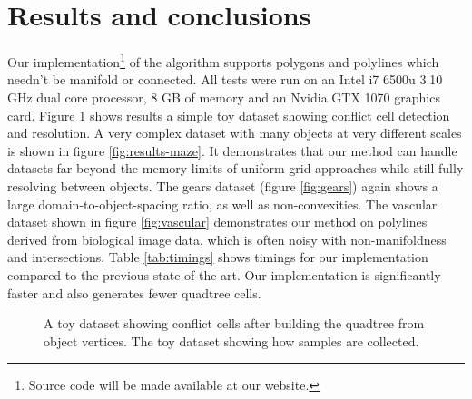 \documentclass[final,3p,times,twocolumn]{elsarticle}
\begin{document}
\section{Results and conclusions}
Our implementation\footnote{
Source code will be made available at our website. %
}
of the algorithm supports polygons and polylines which needn't be manifold or connected. All tests were run on
 an Intel i7 6500u 3.10 GHz dual core processor, 8 GB of memory and an Nvidia GTX 1070 graphics card. Figure \ref{fig:results-toy} shows results a simple toy dataset showing conflict cell detection and resolution. A very complex dataset with many objects at very different scales is shown in figure \ref{fig:results-maze}. It demonstrates that our method can handle datasets far beyond the memory limits of uniform grid approaches while still fully resolving between objects. The gears dataset (figure \ref{fig:gears}) again shows a large domain-to-object-spacing ratio, as well as non-convexities. The vascular dataset shown in figure \ref{fig:vascular} demonstrates our method on polylines derived from biological image data, which is often noisy with non-manifoldness and intersections. Table \ref{tab:timings} shows timings for our implementation compared to the previous state-of-the-art. Our implementation is significantly faster and also generates fewer quadtree cells.

\begin{figure}
  \centering

  \caption{
    \protect{} A toy dataset showing conflict cells after building the quadtree from object vertices.
    \protect{} The toy dataset showing how samples are collected.
  }
  \label{fig:results-toy}
\end{figure}
\end{document}
